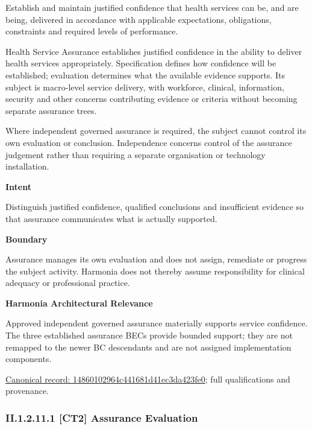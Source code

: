 Establish and maintain justified confidence that health services can be, and are being, delivered in accordance with applicable expectations, obligations, constraints and required levels of performance.



Health Service Assurance establishes justified confidence in the ability to deliver health services appropriately. Specification defines how confidence will be established; evaluation determines what the available evidence supports. Its subject is macro-level service delivery, with workforce, clinical, information, security and other concerns contributing evidence or criteria without becoming separate assurance trees.



Where independent governed assurance is required, the subject cannot control its own evaluation or conclusion. Independence concerns control of the assurance judgement rather than requiring a separate organisation or technology installation.



\textbf{Intent}



Distinguish justified confidence, qualified conclusions and insufficient evidence so that assurance communicates what is actually supported.



\textbf{Boundary}



Assurance manages its own evaluation and does not assign, remediate or progress the subject activity. Harmonia does not thereby assume responsibility for clinical adequacy or professional practice.



\textbf{Harmonia Architectural Relevance}



Approved independent governed assurance materially supports service confidence. The three established assurance BECs provide bounded support; they are not remapped to the newer BC descendants and are not assigned implementation components.


{\footnotesize \href{../../../../continuum/strategy/capability/14860102964c441681d41ec3da423fe0.md}{Canonical record: 14860102964c441681d41ec3da423fe0}; full qualifications and provenance.}\par
\subsubsection*{II.1.2.11.1 [CT2] Assurance Evaluation}
\label{navigation:II.1.2.11.1}

